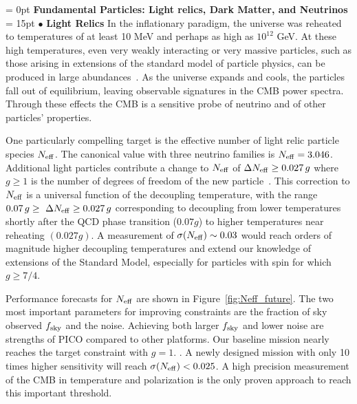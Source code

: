 \documentclass[PICOReport.tex]{subfiles}
\begin{document}
\vspace{0.1in}
\parindent = 0pt
{\bf Fundamental Particles: Light relics, Dark Matter, and Neutrinos} \\ %
\parindent = 15pt
$\bullet$ {\bf Light Relics} \hspace{0.1in} In the inflationary paradigm, the universe was reheated to temperatures of 
at least 10 MeV and perhaps as 
high as $10^{12}$ GeV.  At these high temperatures, even very weakly interacting or very massive particles, 
such as those arising in extensions of the standard model of particle physics, can be produced in large 
abundances~\cite{1979ARNPS..29..313S,Bolz:2000fu}.  As the universe expands and cools, 
the particles fall out of equilibrium, leaving observable signatures in the CMB power spectra. 
Through these effects the CMB is a sensitive probe of neutrino and of other particles' properties.  


One particularly compelling target is the effective number of light relic particle species ${N_{\rm eff}}$.
The canonical value with three neutrino families is ${N_{\rm eff}} = 3.046$. Additional light particles 
contribute a change to ${N_{\rm eff}}$ of $\Delta {N_{\rm eff}} \geq 0.027\,g$ where $g \geq 1$ is the number of 
degrees of freedom of the new particle~\cite{Brust:2013xpv,Baumann:2016wac}.  
This correction to ${N_{\rm eff}}$ is a universal function of the decoupling temperature, with the range 
$ 0.07\,g \geq \ \Delta {N_{\rm eff}} \geq 0.027\,g$ corresponding to decoupling from lower temperatures shortly after the QCD phase 
transition ($0.07g$) to higher temperatures near reheating $(0.027g)$.  A measurement of $\sigma({N_{\rm eff}}) \sim 0.03$ would 
reach orders of magnitude  higher decoupling temperatures and extend our knowledge of extensions 
of the Standard Model, especially for particles with spin for which $g \geq 7/4$. 

Performance forecasts for ${N_{\rm eff}}$ are shown in Figure~\ref{fig:Neff_future}.  The two most important parameters 
for improving constraints are the fraction of sky observed $f_{\rm sky}$ and the noise. Achieving both larger $f_{\rm sky}$ 
and lower noise are strengths of PICO compared to other platforms. 
Our baseline mission nearly reaches the target constraint with $g=1$. . 
A newly designed mission with only 10 times higher sensitivity will reach $\sigma({N_{\rm eff}}) < 0.025$.  A high precision measurement of the 
CMB in temperature and polarization is the only proven approach to reach this important threshold.  
\end{document}
